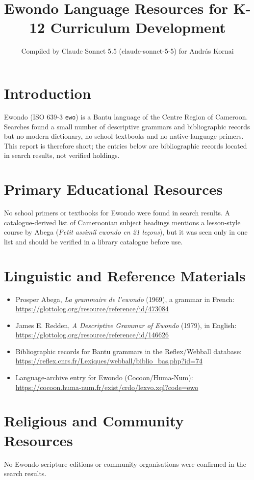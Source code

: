 \documentclass[12pt]{article}
\title{Ewondo Language Resources for K-12 Curriculum Development}
\author{Compiled by Claude Sonnet 5.5 (claude-sonnet-5-5) for Andr\'as Kornai}
\date{}
\begin{document}
\maketitle

\section{Introduction}
Ewondo (ISO 639-3 \texttt{ewo}) is a Bantu language of the Centre Region of Cameroon. Searches found a small number of descriptive grammars and bibliographic records but no modern dictionary, no school textbooks and no native-language primers. This report is therefore short; the entries below are bibliographic records located in search results, not verified holdings.

\section{Primary Educational Resources}
No school primers or textbooks for Ewondo were found in search results. A catalogue-derived list of Cameroonian subject headings mentions a lesson-style course by Abega (\emph{Petit assimil ewondo en 21 leçons}), but it was seen only in one list and should be verified in a library catalogue before use.

\section{Linguistic and Reference Materials}
\begin{itemize}
\item Prosper Abega, \emph{La grammaire de l'ewondo} (1969), a grammar in French: \url{https://glottolog.org/resource/reference/id/473084}
\item James E. Redden, \emph{A Descriptive Grammar of Ewondo} (1979), in English: \url{https://glottolog.org/resource/reference/id/146626}
\item Bibliographic records for Bantu grammars in the Reflex/Webball database: \url{https://reflex.cnrs.fr/Lexiques/webball/biblio_bas.php?id=74}
\item Language-archive entry for Ewondo (Cocoon/Huma-Num): \url{https://cocoon.huma-num.fr/exist/crdo/lexvo.xql?code=ewo}
\end{itemize}

\section{Religious and Community Resources}
No Ewondo scripture editions or community organisations were confirmed in the search results.
\end{document}
